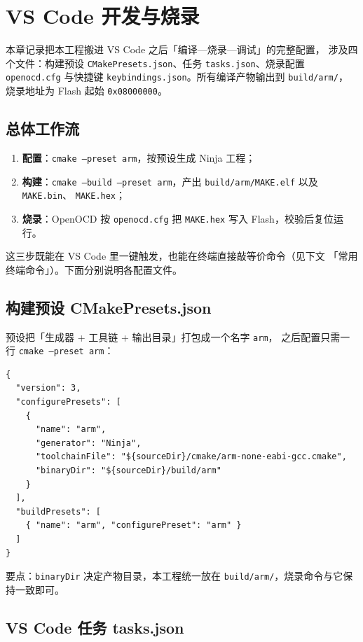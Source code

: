 \section{VS Code 开发与烧录}

本章记录把本工程搬进 VS Code 之后「编译—烧录—调试」的完整配置，
涉及四个文件：构建预设 \texttt{CMakePresets.json}、任务
\texttt{tasks.json}、烧录配置 \texttt{openocd.cfg} 与快捷键
\texttt{keybindings.json}。所有编译产物输出到 \texttt{build/arm/}，
烧录地址为 Flash 起始 \texttt{0x08000000}。

\subsection{总体工作流}

\begin{enumerate}
  \item \textbf{配置}：\texttt{cmake --preset arm}，按预设生成 Ninja 工程；
  \item \textbf{构建}：\texttt{cmake --build --preset arm}，产出
        \texttt{build/arm/MAKE.elf} 以及 \texttt{MAKE.bin}、
        \texttt{MAKE.hex}；
  \item \textbf{烧录}：OpenOCD 按 \texttt{openocd.cfg} 把
        \texttt{MAKE.hex} 写入 Flash，校验后复位运行。
\end{enumerate}

这三步既能在 VS Code 里一键触发，也能在终端直接敲等价命令（见下文
「常用终端命令」）。下面分别说明各配置文件。

\subsection{构建预设 CMakePresets.json}

预设把「生成器 + 工具链 + 输出目录」打包成一个名字 \texttt{arm}，
之后配置只需一行 \texttt{cmake --preset arm}：

\begin{lstlisting}[style=generic]
{
  "version": 3,
  "configurePresets": [
    {
      "name": "arm",
      "generator": "Ninja",
      "toolchainFile": "${sourceDir}/cmake/arm-none-eabi-gcc.cmake",
      "binaryDir": "${sourceDir}/build/arm"
    }
  ],
  "buildPresets": [
    { "name": "arm", "configurePreset": "arm" }
  ]
}
\end{lstlisting}

要点：\texttt{binaryDir} 决定产物目录，本工程统一放在
\texttt{build/arm/}，烧录命令与它保持一致即可。

\subsection{VS Code 任务 tasks.json}

